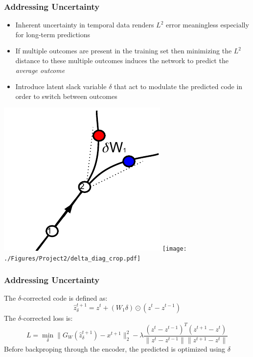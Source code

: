 \documentclass{beamer}
\begin{document}
\begin{frame} 
\frametitle{Addressing Uncertainty}
\begin{itemize}
\item Inherent uncertainty in temporal data renders $L^2$ error meaningless especially for long-term predictions 
\item If multiple outcomes are present in the training set then minimizing the $L^2$ distance to these multiple outcomes induces the network to predict the \emph{average outcome} 
\item Introduce latent slack variable $\delta$ that act to modulate the predicted code in order to switch between outcomes 
\end{itemize}
\begin{center} 
\includegraphics[scale=0.5]{./Figures/Project2/delta_ambiguity.pdf} \hspace{0.5cm} 
\texttt{[image: ./Figures/Project2/delta\_diag\_crop.pdf]} 
\end{center} 
\end{frame} 

\begin{frame} 
\frametitle{Addressing Uncertainty}
The $\delta$-corrected code is defined as:
\begin{equation} 
\nonumber 
\label{eqn:delta}
\hat z^{t+1}_\delta =  z^{t} + (W_1 \delta) \odot (z^t-z^{t-1})
\end{equation}  
The $\delta$-corrected loss is: 
\begin{equation} 
\nonumber 
\label{eqn:delta_loss}
L = \min\limits_\delta \| G_W(\hat z_\delta ^{t+1}) - x^{t+1} \|^2_2 - \lambda \frac{(z^t - z^{t-1})^T(z^{t+1} - z^t)}{\|z^t-z^{t-1}\| \|z^{t+1} - z^t\|} 
\end{equation} 
Before backproping through the encoder, the predicted is optimized using $\delta$ 
\end{frame} 
\end{document}
